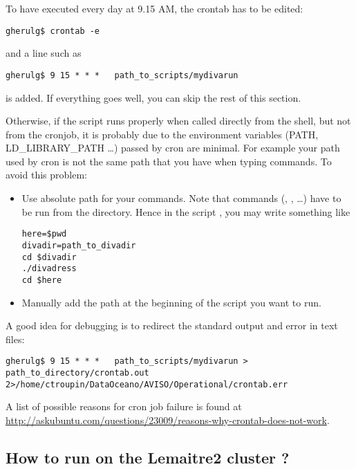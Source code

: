 To have  executed every day at 9.15 AM, the crontab has to be edited:
\begin{lstlisting}[style=Bash]
gherulg$ crontab -e
\end{lstlisting}
and a line such as 
\begin{lstlisting}[style=Bash]
gherulg$ 9 15 * * *   path_to_scripts/mydivarun
\end{lstlisting}
is added. If everything goes well, you can skip the rest of this section.

Otherwise, if the script runs properly when called directly from the shell, but not from the cronjob, it is probably due to the environment variables (PATH, LD\_LIBRARY\_PATH \ldots) passed by cron are minimal. For example your path used by cron is not the same path that you have when typing commands. To avoid this problem:
\begin{itemize}
\item Use absolute path for your commands. Note that \diva commands (, , \ldots) have to be run from the  directory. Hence in the script , you may write something like
\begin{lstlisting}[style=Bash]
here=$pwd
divadir=path_to_divadir
cd $divadir
./divadress
cd $here
\end{lstlisting}
\item Manually add the path at the beginning of the script you want to run.
\end{itemize}

A good idea for debugging is to redirect the standard output and error in text files:
\begin{lstlisting}[style=Bash]
gherulg$ 9 15 * * *   path_to_scripts/mydivarun > path_to_directory/crontab.out 2>/home/ctroupin/DataOceano/AVISO/Operational/crontab.err
\end{lstlisting}

A list of possible reasons for cron job failure is found at\\
\url{http://askubuntu.com/questions/23009/reasons-why-crontab-does-not-work}.

\subsection{How to run \diva on the Lemaitre2 cluster ?}

